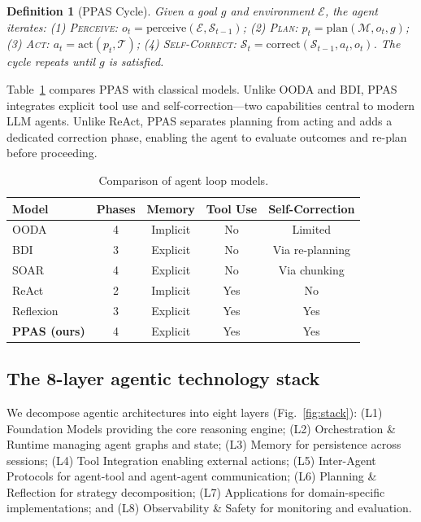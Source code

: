 \documentclass[10pt]{article}
\newtheorem{definition}{Definition}
\begin{document}
\begin{definition}[PPAS Cycle]
Given a goal $g$ and environment $\mathcal{E}$, the agent iterates: (1) \textsc{Perceive}: $o_t = \text{perceive}(\mathcal{E}, \mathcal{S}_{t-1})$; (2) \textsc{Plan}: $p_t = \text{plan}(\mathcal{M}, o_t, g)$; (3) \textsc{Act}: $a_t = \text{act}(p_t, \mathcal{T})$; (4) \textsc{Self-Correct}: $\mathcal{S}_t = \text{correct}(\mathcal{S}_{t-1}, a_t, o_t)$. The cycle repeats until $g$ is satisfied.
\end{definition}

Table~\ref{tab:loop-comparison} compares PPAS with classical models. Unlike OODA and BDI, PPAS integrates explicit tool use and self-correction---two capabilities central to modern LLM agents. Unlike ReAct\cite{yao2023react}, PPAS separates planning from acting and adds a dedicated correction phase, enabling the agent to evaluate outcomes and re-plan before proceeding.

\begin{table}[ht]
\centering
\caption{Comparison of agent loop models.}
\label{tab:loop-comparison}
\begin{tabular}{lcccc}
\toprule
\textbf{Model} & \textbf{Phases} & \textbf{Memory} & \textbf{Tool Use} & \textbf{Self-Correction} \\
\midrule
OODA\cite{boyd1987ooda}          & 4 & Implicit  & No  & Limited \\
BDI\cite{rao1995bdi}             & 3 & Explicit  & No  & Via re-planning \\
SOAR\cite{laird2012soar}         & 4 & Explicit  & No  & Via chunking \\
ReAct\cite{yao2023react}         & 2 & Implicit  & Yes & No \\
Reflexion\cite{shinn2023reflexion} & 3 & Explicit & Yes & Yes \\
\textbf{PPAS (ours)}              & 4 & Explicit  & Yes & Yes \\
\bottomrule
\end{tabular}
\end{table}

\subsection*{The 8-layer agentic technology stack}

We decompose agentic architectures into eight layers (Fig.~\ref{fig:stack}): (L1) Foundation Models providing the core reasoning engine; (L2) Orchestration \& Runtime managing agent graphs and state; (L3) Memory for persistence across sessions; (L4) Tool Integration enabling external actions; (L5) Inter-Agent Protocols for agent-tool and agent-agent communication; (L6) Planning \& Reflection for strategy decomposition; (L7) Applications for domain-specific implementations; and (L8) Observability \& Safety for monitoring and evaluation.
\end{document}
